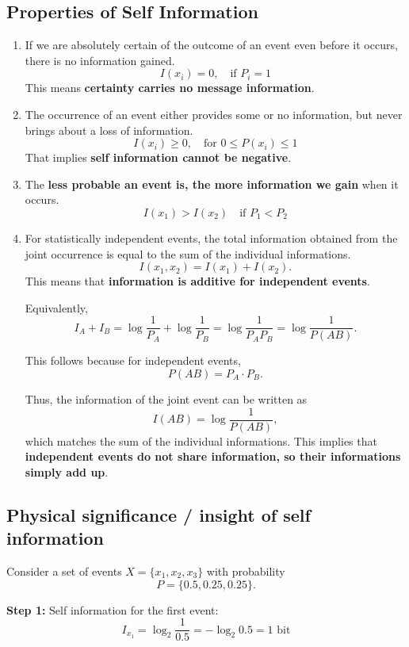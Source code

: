 \documentclass[11pt,a4paper]{book}
\begin{document}
\subsection{Properties of Self Information}
\begin{enumerate}
    \item If we are absolutely certain of the outcome of an event even before it occurs, there is no information gained.
    \[
    I(x_i) = 0, \quad \text{if } P_i = 1
    \]
    This means \textbf{certainty carries no message information}.
    \item The occurrence of an event either provides some or no information, but never brings about a loss of information.
    \[
    I(x_i) \geq 0, \quad \text{for } 0 \leq P(x_i) \leq 1
    \]
    That implies \textbf{self information cannot be negative}.
    \item The \textbf{less probable an event is, the more information we gain} when it occurs.
    \[
    I(x_1) > I(x_2) \quad \text{if } P_1 < P_2
    \]
    \item For statistically independent events, the total information obtained from the joint occurrence is equal to the sum of the individual informations.
    \[
    I(x_1, x_2) = I(x_1) + I(x_2).
    \]
    This means that \textbf{information is additive for independent events}.

    Equivalently,
    \[
    I_A + I_B = \log \frac{1}{P_A} + \log \frac{1}{P_B}
    = \log \frac{1}{P_A P_B}
    = \log \frac{1}{P(AB)}.
    \]

    This follows because for independent events,
    \[
    P(AB) = P_A \cdot P_B.
    \]

    Thus, the information of the joint event can be written as
    \[
    I(AB) = \log \frac{1}{P(AB)},
    \]
    which matches the sum of the individual informations. This implies that \textbf{independent events do not share information, so their informations simply add up}.
\end{enumerate}

\subsection{Physical significance / insight of self information}
Consider a set of events $X = \{x_1, x_2, x_3\}$ with probability
\[
P = \{0.5, 0.25, 0.25\}.
\]

\textbf{Step 1:} Self information for the first event:
\[
I_{x_1} = \log_2 \frac{1}{0.5} = -\log_2 0.5 = 1 \text{ bit}
\]
\end{document}
